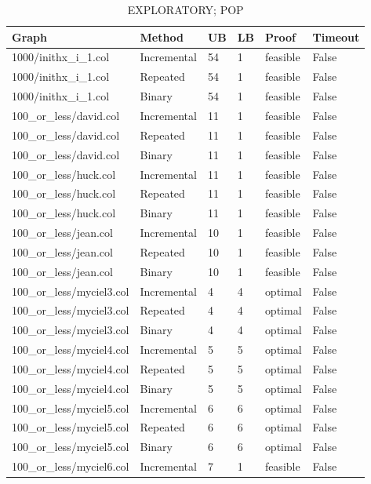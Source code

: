 \begin{table}[htbp]
\centering
\caption{EXPLORATORY; POP}
\label{tab:p2a-POP-exploratory-results}
\begin{tabular}{llllll}
\hline
Graph & Method & UB & LB & Proof & Timeout \\
\hline
1000/inithx\_i\_1.col & Incremental & 54 & 1 & feasible & False \\
1000/inithx\_i\_1.col & Repeated & 54 & 1 & feasible & False \\
1000/inithx\_i\_1.col & Binary & 54 & 1 & feasible & False \\
100\_or\_less/david.col & Incremental & 11 & 1 & feasible & False \\
100\_or\_less/david.col & Repeated & 11 & 1 & feasible & False \\
100\_or\_less/david.col & Binary & 11 & 1 & feasible & False \\
100\_or\_less/huck.col & Incremental & 11 & 1 & feasible & False \\
100\_or\_less/huck.col & Repeated & 11 & 1 & feasible & False \\
100\_or\_less/huck.col & Binary & 11 & 1 & feasible & False \\
100\_or\_less/jean.col & Incremental & 10 & 1 & feasible & False \\
100\_or\_less/jean.col & Repeated & 10 & 1 & feasible & False \\
100\_or\_less/jean.col & Binary & 10 & 1 & feasible & False \\
100\_or\_less/myciel3.col & Incremental & 4 & 4 & optimal & False \\
100\_or\_less/myciel3.col & Repeated & 4 & 4 & optimal & False \\
100\_or\_less/myciel3.col & Binary & 4 & 4 & optimal & False \\
100\_or\_less/myciel4.col & Incremental & 5 & 5 & optimal & False \\
100\_or\_less/myciel4.col & Repeated & 5 & 5 & optimal & False \\
100\_or\_less/myciel4.col & Binary & 5 & 5 & optimal & False \\
100\_or\_less/myciel5.col & Incremental & 6 & 6 & optimal & False \\
100\_or\_less/myciel5.col & Repeated & 6 & 6 & optimal & False \\
100\_or\_less/myciel5.col & Binary & 6 & 6 & optimal & False \\
100\_or\_less/myciel6.col & Incremental & 7 & 1 & feasible & False \\

\end{tabular}
\end{table}
